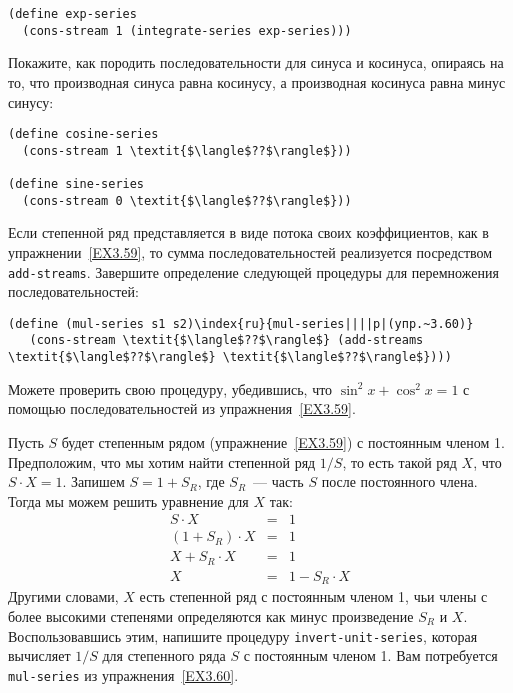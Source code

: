 \begin{exercise}{3.59}
\begin{plainenum}
\begin{Verbatim}[fontsize=\small]
(define exp-series
  (cons-stream 1 (integrate-series exp-series)))
\end{Verbatim}
Покажите, как породить последовательности для синуса и косинуса,
опираясь на то, что производная синуса равна косинусу, а производная
косинуса равна минус синусу:

\begin{Verbatim}[fontsize=\small]
(define cosine-series
  (cons-stream 1 \textit{$\langle$??$\rangle$}))

(define sine-series
  (cons-stream 0 \textit{$\langle$??$\rangle$}))
\end{Verbatim}
\end{plainenum}
\end{exercise}
\begin{exercise}{3.60}\label{EX3.60}%
Если степенной ряд представляется в виде потока своих
коэффициентов, как в упражнении~\ref{EX3.59}, то сумма
последовательностей реализуется посредством {\tt add-stre\-ams}.
Завершите определение следующей процедуры для   перемножения
последовательностей:

\begin{Verbatim}[fontsize=\small]
(define (mul-series s1 s2)\index{ru}{mul-series||||p|(упр.~3.60)}
   (cons-stream \textit{$\langle$??$\rangle$} (add-streams \textit{$\langle$??$\rangle$} \textit{$\langle$??$\rangle$})))
\end{Verbatim}
Можете проверить свою процедуру, убедившись, что
$\sin^2 x + \cos^2 x = 1$ с помощью последовательностей из
упражнения~\ref{EX3.59}.
\end{exercise}
\begin{exercise}{3.61}\label{EX3.61}%
Пусть $S$ будет степенным рядом
(упражнение~\ref{EX3.59}) с постоянным членом 1.  Предположим, что мы
хотим найти степенной ряд $1/S$, то есть такой ряд
$X$, что $S \cdot X = 1$.  Запишем
$S = 1 + S_R$, где $S_R$~--- часть
$S$ после постоянного члена.  Тогда мы можем решить
уравнение для $X$ так:
$$
\begin{array}{rcl}
S \cdot X               & = & 1\\
(1 + S_R) \cdot X       & = & 1\\
X + S_R \cdot X         & = & 1\\
X                       & = & 1 - S_R \cdot X
\end{array}
$$
Другими словами, $X$ есть степенной ряд с постоянным членом
1, чьи члены с более высокими степенями определяются как минус
произведение $S_R$ и $X$.  Воспользовавшись этим,
напишите процедуру {\tt invert-unit-series}, которая
вычисляет $1/S$ для степенного ряда $S$ с
постоянным членом 1.  Вам потребуется {\tt mul-series} из
упражнения~\ref{EX3.60}.
\end{exercise}
